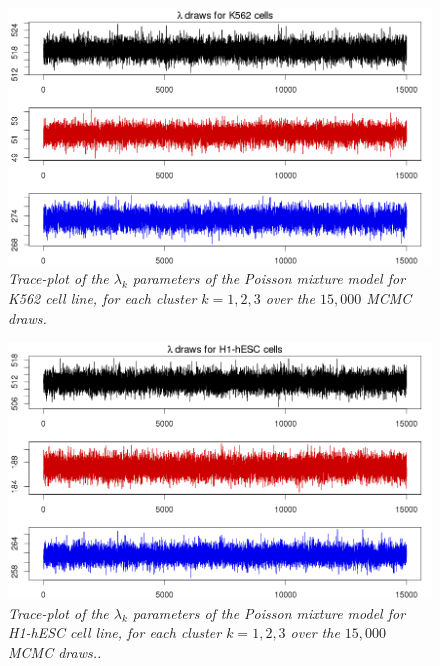 \begin{figure}[!ht]
\begin{center}
 \includegraphics[scale = 0.46]{images/bccMV2DLambdak562}
\caption{\emph{Trace-plot of the $\lambda_{k}$ parameters of the Poisson mixture model for K562 cell line, for each cluster $k=1,2,3$ over the $15,000$ MCMC draws.}}
\label{mix-lambda-pic}
\end{center}
\end{figure}

\begin{figure}[!ht]
\begin{center}
 \includegraphics[scale = 0.46]{images/bccMV2DLambdah1}
\caption{\emph{Trace-plot of the $\lambda_{k}$ parameters of the Poisson mixture model for H1-hESC cell line, for each cluster $k=1,2,3$ over the $15,000$ MCMC draws..}}
\label{mix-lambda2-pic}
\end{center}
\end{figure}


